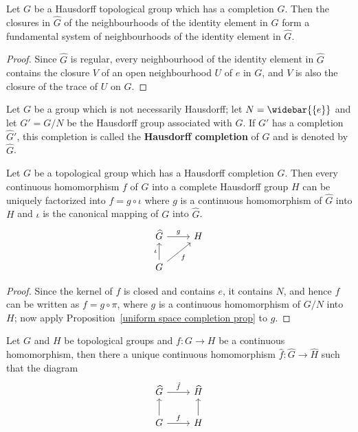\begin{proposition}\label{topological group base of identity in completion is closure}
Let $G$ be a Hausdorff topological group which has a completion $\widehat{G}$. Then the closures in $\widehat{G}$ of the neighbourhoods of the identity element in $G$ form a fundamental system of neighbourhoods of the identity element in $\widehat{G}$.
\end{proposition}
\begin{proof}
Since $\widehat{G}$ is regular, every neighbourhood of the identity element in $\widehat{G}$ contains the closure $V$ of an open neighbourhood $U$ of $e$ in $G$, and $V$ is also the closure of the trace of $U$ on $G$.
\end{proof}
Let $G$ be a group which is not necessarily Hausdorff; let $N=\widebar{\{e\}}$ and let $G'=G/N$ be the Hausdorff group associated with $G$. If $G'$ has a completion $\widehat{G}'$, this completion is called the \textbf{Hausdorff completion} of $G$ and is denoted by $\widehat{G}$.
\begin{proposition}\label{topological group homomorphism into complete Hausdorff extension}
Let $G$ be a topological group which has a Hausdorff completion $\widehat{G}$. Then every continuous homomorphism $f$ of $G$ into a complete Hausdorff group $H$ can be uniquely factorized into $f=g\circ\iota$ where $g$ is a continuous homomorphism of $\widehat{G}$ into $H$ and $\iota$ is the canonical mapping of $G$ into $\widehat{G}$.
\[\begin{tikzcd}
\widehat{G}\ar[r,"g"]&H\\
G\ar[ru,swap,"f"]\ar[u,"\iota"]
\end{tikzcd}\]
\end{proposition}
\begin{proof}
Since the kernel of $f$ is closed and contains $e$, it contains $N$, and hence $f$ can be written as $f=g\circ\pi$, where $g$ is a continuous homomorphism of $G/N$ into $H$; now apply Proposition~\ref{uniform space completion prop} to $g$.
\end{proof}
\begin{proposition}
Let $G$ and $H$ be topological groups and $f:G\to H$ be a continuous homomorphism, then there a unique continuous homomorphism $\hat{f}:\widehat{G}\to\widehat{H}$ such that the diagram
\[\begin{tikzcd}
\widehat{G}\ar[r,"\hat{f}"]&\widehat{H}\\
G\ar[u]\ar[r,"f"]&H\ar[u]
\end{tikzcd}\]
\end{proposition}
